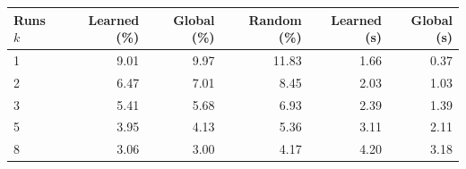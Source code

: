 \begin{tabular}{@{}lrrrrr@{}}
\toprule
\textbf{Runs $k$} & \textbf{Learned (\%)} & \textbf{Global (\%)} & \textbf{Random (\%)} & \textbf{Learned (s)} & \textbf{Global (s)} \\
\midrule
1 & 9.01 & 9.97 & 11.83 & 1.66 & 0.37 \\
2 & 6.47 & 7.01 & 8.45 & 2.03 & 1.03 \\
3 & 5.41 & 5.68 & 6.93 & 2.39 & 1.39 \\
5 & 3.95 & 4.13 & 5.36 & 3.11 & 2.11 \\
8 & 3.06 & 3.00 & 4.17 & 4.20 & 3.18 \\
\bottomrule
\end{tabular}
